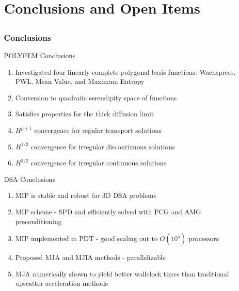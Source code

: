 \documentclass[compress,10pt]{beamer}
\begin{document}
\section{Conclusions and Open Items}
\subsection{}
\begin{frame}[t]\frametitle{Conclusions}
{
\begin{block}{POLYFEM Conclusions}
\begin{enumerate}
\item Investigated four linearly-complete polygonal basis functions: Wachspress, PWL, Mean Value, and Maximum Entropy
\item Conversion to quadratic serendipity space of functions
\item Satisfies properties for the thick diffusion limit
\item $H^{p+1}$ convergence for regular transport solutions
\item $H^{1/2}$ convergence for irregular discontinuous solutions
\item $H^{3/2}$ convergence for irregular continuous solutions
\end{enumerate}
\end{block}
}
{
\begin{block}{DSA Conclusions}
\begin{enumerate}
\item MIP is stable and robust for 3D DSA problems
\item MIP scheme - SPD and efficiently solved with PCG and AMG preconditioning
\item MIP implemented in PDT - good scaling out to $O(10^5)$ processors
\item Proposed MJA and MJIA methods - parallelizable
\item MJA numerically shown to yield better wallclock times than traditional upscatter acceleration methods
\end{enumerate}
\end{block}
}
\end{frame}
\end{document}
